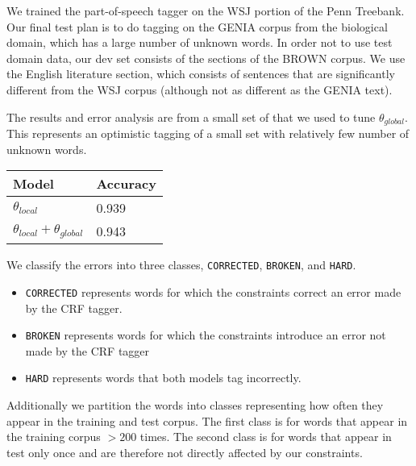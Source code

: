 \documentclass{article}
\newcommand{\thetal}{\theta_{local}}
\newcommand{\thetag}{\theta_{global}}
\begin{document}
We trained the part-of-speech tagger on the WSJ portion of the Penn Treebank. Our final test plan is to do tagging on the GENIA corpus from the biological domain, which has a large number of unknown words. In order not to use test domain data, our dev set consists of the sections of the BROWN corpus. We use the English literature section, which consists of sentences that are significantly different from the WSJ corpus (although not as different as the GENIA text).

The results and error analysis are from a small set of that we used to tune $\thetag$. This represents an optimistic tagging of a small set with relatively few number of unknown words.
\vspace{0.5cm}


\begin{center}
\begin{tabular}{ll}
  Model & Accuracy \\
  \hline
  $\thetal$ & 0.939 \\
  $\thetal + \thetag $ &  0.943 \\
\end{tabular}
\end{center}



We classify the errors into three classes, \texttt{CORRECTED}, \texttt{BROKEN}, and \texttt{HARD}. 

\begin{itemize}
\item \texttt{CORRECTED} represents words for which the constraints correct an error made by the CRF tagger.
\item \texttt{BROKEN} represents words for which the constraints introduce an error not made by the CRF tagger
\item \texttt{HARD} represents words that both models tag incorrectly. 
\end{itemize}

Additionally we partition the words into classes representing how often they appear in the training and test corpus. The first class is for words that appear in the training corpus $> 200$ times. The second class is for words that appear in test only once and are therefore not directly affected by our constraints.  
\end{document}
